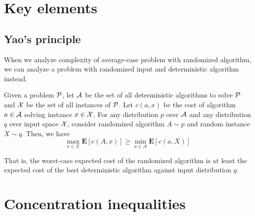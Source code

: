 \documentclass[10pt]{book}
\begin{document}
\section{Key elements}
\subsection{Yao's principle}
When we analyze complexity of average-case problem with randomized algorithm, we can analyze a problem with randomized input and deterministic algorithm instead.
\begin{thm}
 \label{yaoprin}
Given a problem $\mathcal{P}$, let $\mathcal{A}$ be the set of all deterministic algorithms to solve $\mathcal{P}$ and $\mathcal{X}$ be the set of all instances of $\mathcal{P}$.
Let $c(a,x)$ be the cost of algorithm $a\in\mathcal{A}$ solving instance $x\in\mathcal{X}$. For any distribution $p$ over $\mathcal{A}$ and any distribution $q$ over input space $\mathcal{X}$, consider randomized algorithm $A\sim p$ and random instance $X\sim q$. Then, we have
$$
\max _{x \in \mathcal{X}} \mathbf{E}[c(A, x)] \geq \min _{a \in \mathcal{A}} \mathbf{E}[c(a, X)]
$$
\end{thm}
That is, the worst-case expected cost of the randomized algorithm is at least the expected cost of the best deterministic algorithm against input distribution $q$.


\section{Concentration inequalities}


\end{document}
